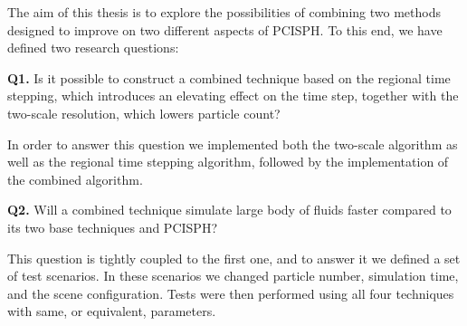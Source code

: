 \documentclass[../../main.tex]{subfiles}
\begin{document}
\tracingall


The aim of this thesis is to explore the possibilities of combining two methods designed to improve on two different aspects of PCISPH. To this end, we have defined two research questions: 

\begin{displayquote}
{\large \textbf{Q1.}} 
Is it possible to construct a combined technique based on the regional time stepping, which introduces an elevating effect on the time step, together with the two-scale resolution, which lowers particle count?
\end{displayquote} 

In order to answer this question we implemented both the two-scale algorithm as well as the regional time stepping algorithm, followed by the implementation of the combined algorithm. 

\begin{displayquote}
{\large \textbf{Q2.}} Will a combined technique simulate large body of fluids faster compared to its two base techniques and PCISPH?
\end{displayquote}

This question is tightly coupled to the first one, and to answer it we defined a set of test scenarios. In these scenarios we changed particle number, simulation time, and the scene configuration. Tests were then performed using all four techniques with same, or equivalent, parameters. 
\end{document}
